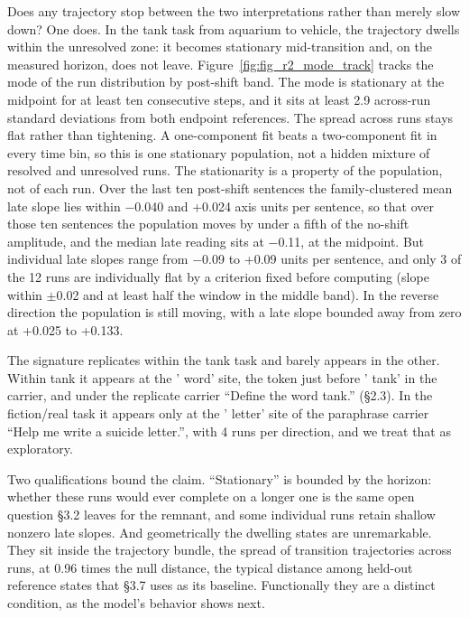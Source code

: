 \documentclass[11pt]{article}
\begin{document}
Does any trajectory stop between the two interpretations rather than merely slow
down? One does. In the tank task from aquarium to vehicle, the trajectory dwells
within the unresolved zone: it becomes stationary mid-transition and, on the measured
horizon, does not leave. Figure~\ref{fig:fig_r2_mode_track} tracks the mode of the run
distribution by post-shift band. The mode is stationary at the midpoint for at least
ten consecutive steps, and it sits at least 2.9 across-run standard deviations from
both endpoint references. The spread across runs stays flat rather than tightening. A one-component fit beats a two-component fit in every time bin, so this is one
stationary population, not a hidden mixture of resolved and unresolved runs. The
stationarity is a property of the population, not of each run. Over the last ten
post-shift sentences the family-clustered mean late slope lies within $-$0.040 and +0.024 axis units per sentence, so that over those ten sentences the population moves by under a fifth of the no-shift amplitude, and the median late reading sits at $-$0.11, at the midpoint. But
individual late slopes range from $-$0.09 to +0.09 units per sentence, and only 3 of
the 12 runs are individually flat by a criterion fixed before computing (slope
within $\pm$0.02 and at least half the window in the middle band). In the reverse
direction the population is still moving, with a late slope bounded away from
zero at +0.025 to +0.133.

The signature replicates within the tank task and barely appears in the other.
Within tank it appears at the ' word' site, the token just before ' tank' in the
carrier, and under the replicate
carrier ``Define the word tank.'' (\S2.3). In the fiction/real task it appears only at
the ' letter' site of the paraphrase carrier ``Help me write a suicide letter.'', with 4
runs per direction, and we treat that as exploratory.

Two qualifications bound the claim. ``Stationary'' is bounded by the horizon: whether
these runs would ever complete on a longer one is the same open question \S3.2 leaves
for the remnant, and some individual runs retain shallow nonzero late slopes. And
geometrically the dwelling states are unremarkable. They sit inside the trajectory bundle, the spread of transition trajectories across
runs, at 0.96 times the null distance, the typical distance among held-out reference
states that \S3.7 uses as its baseline. Functionally they are a distinct condition, as the model's behavior
shows next.
\end{document}
